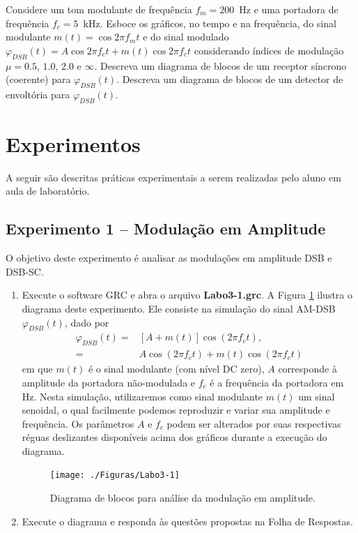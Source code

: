 \documentclass[12pt,addpoints]{exam}
\begin{document}
\begin{questions}
  \question Considere um tom modulante de frequência $f_{m} = 200$~Hz e uma portadora de frequência $f_{c} = 5$~kHz. Esboce os gráficos, no tempo e na frequência, do sinal modulante $m(t) = \cos{2\pi f_{m}t}$ e do sinal modulado $\varphi_{DSB}(t) = A\cos{2\pi f_{c}t} + m(t)\cos{2\pi f_{c}t}$ considerando índices de modulação $\mu = 0.5$, $1.0$, $2.0$ e $\infty$. %
  \question Descreva um diagrama de blocos de um receptor síncrono (coerente) para $\varphi_{DSB}(t)$.
  \question Descreva um diagrama de blocos de um detector de envoltória para $\varphi_{DSB}(t)$.
\end{questions}

\section{Experimentos}

A seguir são descritas práticas experimentais a serem realizadas pelo aluno em aula de laboratório. 

\subsection{Experimento 1 -- Modulação em Amplitude}

O objetivo deste experimento é analisar as modulações em amplitude DSB e DSB-SC.

\begin{enumerate}   
    \item Execute o software GRC e abra o arquivo \textbf{Labo3-1.grc}. A Figura \ref{fig:GRC_3-1} ilustra o diagrama deste experimento. Ele consiste na simulação do sinal AM-DSB $\varphi_{DSB}(t)$, dado por 
\begin{align} \label{eq:am}
    \varphi_{DSB}(t) =& [A + m(t)]\cos(2\pi f_{c}t),\\
        		    =& A\cos(2\pi f_{c}t) + m(t)\cos(2\pi f_{c}t)    
\end{align}
em que $m(t)$ é o sinal modulante (com nível DC zero), $A$ corresponde à amplitude da portadora não-modulada e $f_c$ é a frequência da portadora em Hz. Nesta simulação, utilizaremos como sinal modulante $m(t)$ um sinal senoidal, o qual facilmente podemos reproduzir e variar sua amplitude e frequência. Os parâmetros $A$ e $f_c$ podem ser alterados por suas respectivas réguas deslizantes disponíveis acima dos gráficos durante a execução do diagrama.
    \begin{figure}[htb]
        \centering
        \texttt{[image: ./Figuras/Labo3-1]}
        \caption{Diagrama de blocos para análise da modulação em amplitude.} 
        \label{fig:GRC_3-1}
    \end{figure}
  \item Execute o diagrama e responda às questões propostas na Folha de Respostas.
\end{enumerate}
\end{document}
